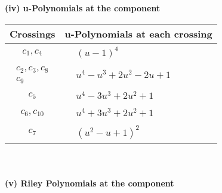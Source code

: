 \documentclass[1p]{elsarticle_modified}
\theoremstyle{definition}
\begin{document}
\newpage\renewcommand{\arraystretch}{1}
\flushleft \textbf{(iv) u-Polynomials at the component}\newline \\
\begin{tabular}{m{50pt}|m{274pt}}
Crossings & \hspace{64pt}u-Polynomials at each crossing \\
\hline $$\begin{aligned}c_{1},c_{4}\end{aligned}$$&$\begin{aligned}
&(u-1)^4
\end{aligned}$\\
\hline $$\begin{aligned}c_{2},c_{3},c_{8}\\c_{9}\end{aligned}$$&$\begin{aligned}
&u^4- u^3+2 u^2-2 u+1
\end{aligned}$\\
\hline $$\begin{aligned}c_{5}\end{aligned}$$&$\begin{aligned}
&u^4-3 u^3+2 u^2+1
\end{aligned}$\\
\hline $$\begin{aligned}c_{6},c_{10}\end{aligned}$$&$\begin{aligned}
&u^4+3 u^3+2 u^2+1
\end{aligned}$\\
\hline $$\begin{aligned}c_{7}\end{aligned}$$&$\begin{aligned}
&(u^2- u+1)^2
\end{aligned}$\\
\hline
\end{tabular}\\~\\
\newpage\renewcommand{\arraystretch}{1}
\flushleft \textbf{(v) Riley Polynomials at the component}\newline \\
\end{document}

